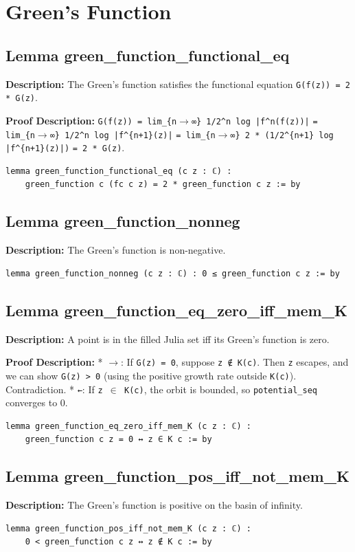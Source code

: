 \section{Green's Function}

\subsection*{Lemma green\_function\_functional\_eq}
\textbf{Description:} The Green's function satisfies the functional equation \texttt{G(f(z)) = 2 * G(z)}.

\textbf{Proof Description:} \texttt{G(f(z)) = lim\_\{n$\to$∞\} 1/2\^{}n log |f\^{}n(f(z))|}
    \texttt{= lim\_\{n$\to$∞\} 1/2\^{}n log |f\^{}\{n+1\}(z)|}
    \texttt{= lim\_\{n$\to$∞\} 2 * (1/2\^{}\{n+1\} log |f\^{}\{n+1\}(z)|)}
    \texttt{= 2 * G(z)}.

\begin{lstlisting}[language=Lean]
lemma green_function_functional_eq (c z : ℂ) :
    green_function c (fc c z) = 2 * green_function c z := by
\end{lstlisting}

\subsection*{Lemma green\_function\_nonneg}
\textbf{Description:} The Green's function is non-negative.

\begin{lstlisting}[language=Lean]
lemma green_function_nonneg (c z : ℂ) : 0 ≤ green_function c z := by
\end{lstlisting}

\subsection*{Lemma green\_function\_eq\_zero\_iff\_mem\_K}
\textbf{Description:} A point is in the filled Julia set iff its Green's function is zero.

\textbf{Proof Description:} *   \texttt{$\to$}: If \texttt{G(z) = 0}, suppose \texttt{z ∉ K(c)}. Then \texttt{z} escapes, and we can show \texttt{G(z) > 0}
        (using the positive growth rate outside \texttt{K(c)}). Contradiction.
    *   \texttt{←}: If \texttt{z $\in$ K(c)}, the orbit is bounded, so \texttt{potential\_seq} converges to 0.

\begin{lstlisting}[language=Lean]
lemma green_function_eq_zero_iff_mem_K (c z : ℂ) :
    green_function c z = 0 ↔ z ∈ K c := by
\end{lstlisting}

\subsection*{Lemma green\_function\_pos\_iff\_not\_mem\_K}
\textbf{Description:} The Green's function is positive on the basin of infinity.

\begin{lstlisting}[language=Lean]
lemma green_function_pos_iff_not_mem_K (c z : ℂ) :
    0 < green_function c z ↔ z ∉ K c := by
\end{lstlisting}

